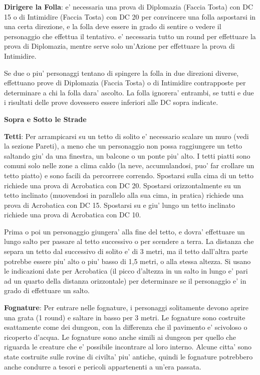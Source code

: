 \documentclass[a4paper,11pt,twoside,openany]{book}
\begin{document}
{		\textbf{Dirigere la Folla}: e' necessaria una prova di Diplomazia (Faccia Tosta) con DC 15 o di Intimidire (Faccia Tosta) con DC 20 per convincere una folla aspostarsi in una certa direzione, e la folla deve essere in grado di sentire o vedere il personaggio che effettua il tentativo. e' necessaria tutto un round per effettuare la prova di Diplomazia, mentre serve solo un'Azione per effettuare la prova di Intimidire.
		
		Se due o piu' personaggi tentano di spingere la folla in due direzioni diverse, effettuano prove di Diplomazia (Faccia Tosta) o di Intimidire contrapposte per determinare a chi la folla dara' ascolto. La folla ignorera' entrambi, se tutti e due i risultati delle prove dovessero essere inferiori alle DC sopra indicate.
		
		\textbf{Sopra e Sotto le Strade}
		
		\textbf{Tetti}: Per arrampicarsi su un tetto di solito e' necessario scalare un muro (vedi la sezione Pareti), a meno che un personaggio non possa raggiungere un tetto saltando giu' da una finestra, un balcone o un ponte piu' alto. I tetti piatti sono comuni solo nelle zone a clima caldo (la neve, accumulandosi, puo' far crollare un tetto piatto) e sono facili da percorrere correndo. Spostarsi sulla cima di un tetto richiede una prova di Acrobatica con DC 20. Spostarsi orizzontalmente su un tetto inclinato (muovendosi in parallelo alla sua cima, in pratica) richiede una prova di Acrobatica con DC 15. Spostarsi su e giu' lungo un tetto inclinato richiede una prova di Acrobatica con DC 10.
		
		Prima o poi un personaggio giungera' alla fine del tetto, e dovra' effettuare un lungo salto per passare al tetto successivo o per scendere a terra. La distanza che separa un tetto dal successivo di solito e' di 3 metri, ma il tetto dall'altra parte potrebbe essere piu' alto o piu' basso di 1,5 metri, o alla stessa altezza. Si usano le indicazioni date per Acrobatica (il picco d'altezza in un salto in lungo e' pari ad un quarto della distanza orizzontale) per determinare se il personaggio e' in grado di effettuare un salto.
		
		\textbf{Fognature}: Per entrare nelle fognature, i personaggi solitamente devono aprire una grata (1 round) e saltare in basso per 3 metri. Le fognature sono costruite esattamente come dei dungeon, con la differenza che il pavimento e' scivoloso o ricoperto d'acqua. Le fognature sono anche simili ai dungeon per quello che riguarda le creature che e' possibile incontrare al loro interno. Alcune citta' sono state costruite sulle rovine di civilta' piu' antiche, quindi le fognature potrebbero anche condurre a tesori e pericoli appartenenti a un'era passata.
		
}
\end{document}
